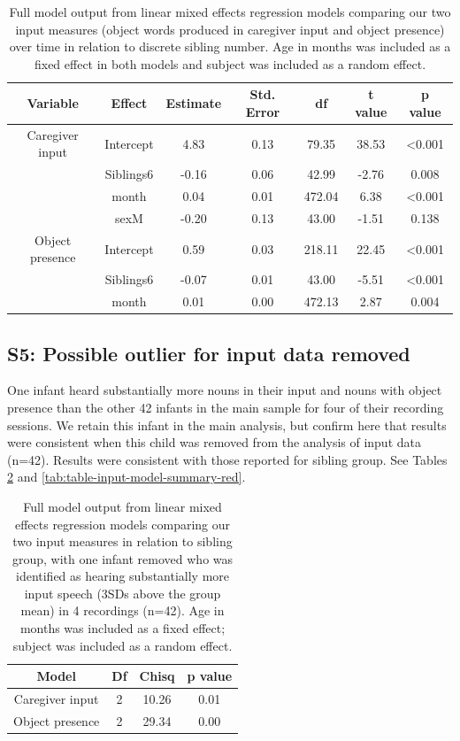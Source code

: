\documentclass[
  english,
  man,floatsintext]{apa6}
\begin{document}
\begin{longtable}[t]{ccccccc}
\caption{\label{tab:table-input-model-summary-discrete}Full model output from linear mixed effects regression models comparing our two input measures (object words produced in caregiver input and object presence) over time in relation to discrete sibling number. Age in months was included as a fixed effect in both models and subject was included as a random effect.}\\
\toprule
Variable & Effect & Estimate & Std. Error & df & t value & p value\\
\midrule
Caregiver input & Intercept & 4.83 & 0.13 & 79.35 & 38.53 & <0.001\\
 & Siblings6 & -0.16 & 0.06 & 42.99 & -2.76 & 0.008\\
 & month & 0.04 & 0.01 & 472.04 & 6.38 & <0.001\\
 & sexM & -0.20 & 0.13 & 43.00 & -1.51 & 0.138\\
\midrule
Object presence & Intercept & 0.59 & 0.03 & 218.11 & 22.45 & <0.001\\
\addlinespace
 & Siblings6 & -0.07 & 0.01 & 43.00 & -5.51 & <0.001\\
 & month & 0.01 & 0.00 & 472.13 & 2.87 & 0.004\\
\bottomrule
\end{longtable}

\newpage

\hypertarget{s5-possible-outlier-for-input-data-removed}{%
\subsection{S5: Possible outlier for input data removed}\label{s5-possible-outlier-for-input-data-removed}}

One infant heard substantially more nouns in their input and nouns with object presence than the other 42 infants in the main sample for four of their recording sessions. We retain this infant in the main analysis, but confirm here that results were consistent when this child was removed from the analysis of input data (n=42). Results were consistent with those reported for sibling group. See Tables \ref{tab:table-model-comparisons-red} and \ref{tab:table-input-model-summary-red}.

\begin{longtable}[t]{cccc}
\caption{\label{tab:table-model-comparisons-red}Full model output from linear mixed effects regression models comparing our two input measures in relation to sibling group, with one infant removed who was identified as hearing substantially more input speech (3SDs above the group mean) in 4 recordings (n=42). Age in months was included as a fixed effect; subject was included as a random effect.}\\
\toprule
Model & Df & Chisq & p value\\
\midrule
Caregiver input & 2 & 10.26 & 0.01\\
Object presence & 2 & 29.34 & 0.00\\
\bottomrule
\end{longtable}
\end{document}
